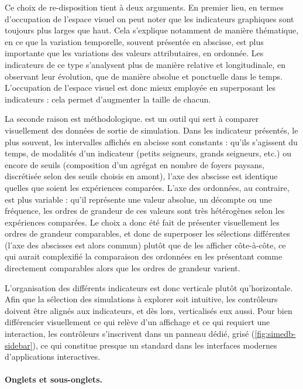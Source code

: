 Ce choix de re-disposition tient à deux arguments.
En premier lieu, en termes d'occupation de l'espace visuel on peut noter que les indicateurs graphiques sont toujours plus larges que haut.
Cela s'explique notamment de manière thématique, en ce que la variation temporelle, souvent présentée en abscisse, est plus importante que les variations des valeurs attributaires, en ordonnée.
Les indicateurs de ce type s'analysent plus de manière relative et longitudinale, en observant leur évolution, que de manière absolue et ponctuelle dans le temps.
L'occupation de l'espace visuel est donc mieux employée en superposant les indicateurs : cela permet d'augmenter la taille de chacun.

La seconde raison est méthodologique.
\simedb{} est un outil qui sert à comparer visuellement des données de sortie de simulation.
Dans les indicateur présentés, le plus souvent, les intervalles affichés en abcisse sont constants : qu'ils s'agissent du temps, de modalités d'un indicateur (petits seigneurs, grands seigneurs, etc.) ou encore de seuils (composition d'un agrégat en nombre de foyers paysans, discrétisée selon des seuils choisis en amont), l'axe des abscisse est identique quelles que soient les expériences comparées.
L'axe des ordonnées, au contraire, est plus variable : qu'il représente une valeur absolue, un décompte ou une fréquence, les ordres de grandeur de ces valeurs sont très hétérogènes selon les expériences comparées.
Le choix a donc été fait de présenter visuellement les ordres de grandeur comparables, et donc de superposer les sélections différentes (l'axe des abscisses est alors commun) plutôt que de les afficher côte-à-côte, ce qui aurait complexifié la comparaison des ordonnées en les présentant comme directement comparables alors que les ordres de grandeur varient.


L'organisation des différents indicateurs est donc verticale plutôt qu'horizontale.
Afin que la sélection des simulations à explorer soit intuitive, les contrôleurs doivent être alignés aux indicateurs, et dès lors, verticalisés eux aussi.
Pour bien différencier visuellement ce qui relève d'un affichage et ce qui requiert une interaction, les contrôleurs s'inscrivent dans un panneau dédié, grisé (\cref{fig:simedb-sidebar}), ce qui constitue presque un standard dans les interfaces modernes d'applications interactives.

\paragraph{Onglets et sous-onglets.}

